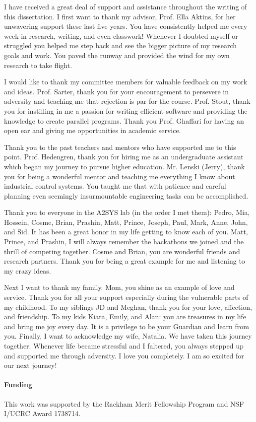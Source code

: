 I have received a great deal of support and assistance throughout the writing of this dissertation. I first want to thank my advisor, Prof. Ella Aktins, for her unwavering support these last five years. You have consistently helped me every week in research, writing, and even classwork! Whenever I doubted myself or struggled you helped me step back and see the bigger picture of my research goals and work. You paved the runway and provided the wind for my own research to take flight.

I would like to thank my committee members for valuable feedback on my work and ideas. Prof. Sarter, thank you for your encouragement to persevere in adversity and teaching me that rejection is par for the course. Prof. Stout, thank you for instilling in me a passion for writing efficient software and providing the knowledge to create parallel programs. Thank you Prof. Ghaffari for having an open ear and giving me opportunities in academic service.


Thank you to the past teachers and mentors who have supported me to this point. Prof. Hedengren, thank you for hiring me as an undergraduate assistant which began my journey to pursue higher education. Mr. Lenski (Jerry), thank you for being a wonderful mentor and teaching me everything I know about industrial control systems. You taught me that with patience and careful planning even seemingly insurmountable engineering tasks can be accomplished. 

Thank you to everyone in the A2SYS lab (in the order I met them): Pedro, Mia, Hossein, Cosme, Brian, Prashin, Matt, Prince, Joseph, Paul, Mark, Anne, John, and Sid.  It has been a great honor in my life getting to know each of you. Matt, Prince, and Prashin, I will always remember the hackathons we joined and the thrill of competing together. Cosme and Brian, you are wonderful friends and research partners. Thank you for being a great example for me and listening to my crazy ideas.

Next I want to thank my family. Mom, you shine as an example of love and service. Thank you for all your support especially during the vulnerable parts of my childhood. To my siblings JD and Meghan, thank you for your love, affection, and friendship. To my kids Kiara, Emily, and Alan: you are treasures in my life and bring me joy every day. It is a privilege to be your Guardian and learn from you.  Finally, I want to acknowledge my wife, Natalia. We have taken this journey together. Whenever life became stressful and I faltered, you always stepped up and supported me through adversity. I love you completely. I am so excited for our next journey!  


\paragraph{Funding}
This work was supported by the Rackham Merit Fellowship Program and NSF I/UCRC Award 1738714. 

